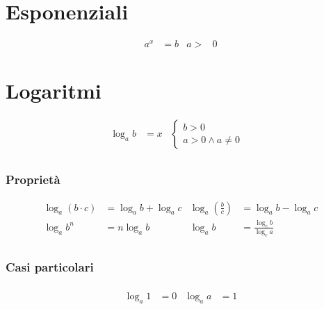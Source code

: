 \documentclass[a4paper]{article}
\begin{document}
	\newpage
	\section{Esponenziali}
	\begin{align*}
		a^x &= b		&		a>&0
	\end{align*}
		
			\begin{center}
		\end{center}
		
	\section{Logaritmi}
	\begin{align*}
		\log_{a}{b} &= x
		&
		\begin{cases}
		b > 0\\
		a > 0 \wedge a \ne 0
		\end{cases}&\\
	\end{align*}
	
	\subsubsection{Proprietà}
	\begin{align*}
		\log_{a}(b \cdot c)                 & = \log_{a} b + \log_{a} c &
		\log_{a} \left( \frac{b}{c} \right) & = \log_{a} b - \log_{a} c \\
		\log_{a} b^n                        & = n \log_{a} b		&
		\log_{a} b 							& = \frac{\log_{c} b}{\log_{c} a}\\
	\end{align*}
	\subsubsection{Casi particolari}
	\begin{align*}
		\\ \log_{a} 1 &= 0 &
		\log_{a} a &= 1
	\end{align*}
		
\end{document}
